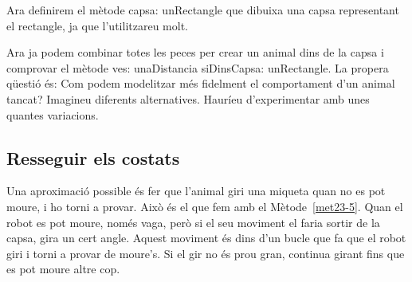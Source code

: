 Ara definirem el mètode \textsf{capsa: unRectangle} que dibuixa una capsa representant el rectangle, ja que l'utilitzareu molt.


Ara ja podem combinar totes les peces per crear un animal dins de la capsa i comprovar el mètode \textsf{ves: unaDistancia siDinsCapsa: unRectangle}. La propera qüestió és: Com podem modelitzar més fidelment el comportament d'un animal tancat? Imagineu diferents alternatives. Hauríeu d'experimentar amb unes quantes variacions.

\subsection{Resseguir els costats}
Una aproximació possible és fer que l'animal giri una miqueta quan no es pot moure, i ho torni a provar. Això és el que fem amb el Mètode~\ref{met23-5}. Quan el robot es pot moure, només vaga, però si el seu moviment el faria sortir de la capsa, gira un cert angle. Aquest moviment és dins d'un bucle que fa que el robot giri i torni a provar de moure's. Si el gir no és prou gran, continua girant fins que es pot moure altre cop.

